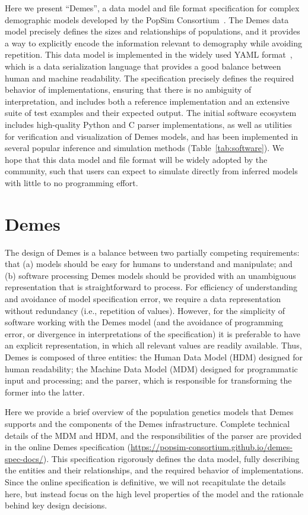 \documentclass[11pt]{article}
\begin{document}
Here we present ``Demes'', a data model and file format specification for
complex demographic models developed by the
PopSim Consortium~\citep{adrion2020community}.
The Demes data model precisely defines the sizes and relationships
of populations, and it provides a way to explicitly encode the
information relevant to demography while avoiding repetition.
This data model is implemented in the widely used YAML
format~\citep{ben2009yaml}, which is a data serialization language that
provides a good balance between human and machine readability.
The specification precisely defines the required behavior of implementations,
ensuring that there is no ambiguity of interpretation, and includes both a
reference implementation and an extensive suite of test examples and their
expected output.
The initial software ecosystem includes high-quality Python
and C parser implementations, as well as utilities for verification and
visualization of Demes models, and has been implemented in several popular
inference and simulation methods (Table~\ref{tab:software}).
We hope that this data model and file format will be widely adopted
by the community, such that users can expect to simulate directly
from inferred models with little to no programming effort.


\section*{Demes}

The design of Demes is a balance between two partially competing requirements:
that (a) models should be easy for humans to understand and manipulate;
and (b) software processing Demes models should be provided with an unambiguous
representation that is straightforward to process.
For efficiency of understanding and avoidance of model specification error,
we require a data representation without redundancy (i.e., repetition of values).
However, for the simplicity of software working with the Demes model
(and the avoidance of programming error, or divergence in
interpretations of the specification) it is preferable to have an explicit
representation, in which all relevant values are readily available.
Thus, Demes is composed of three entities:
the Human Data Model (HDM) designed for human readability;
the Machine Data Model (MDM) designed for programmatic input and processing;
and the parser, which is responsible for transforming the former
into the latter.

Here we provide a brief overview of the population genetics models
that Demes supports and the components of the Demes infrastructure.
Complete technical details of the MDM and HDM, and the responsibilities
of the parser are provided in the online Demes specification
(\url{https://popsim-consortium.github.io/demes-spec-docs/}).
This specification rigorously defines the data model,
fully describing the entities and their
relationships, and the required behavior of implementations.
Since the online specification is definitive,
we will not recapitulate the details
here, but instead focus on the high level properties of the model and
the rationale behind key design decisions.
\end{document}
